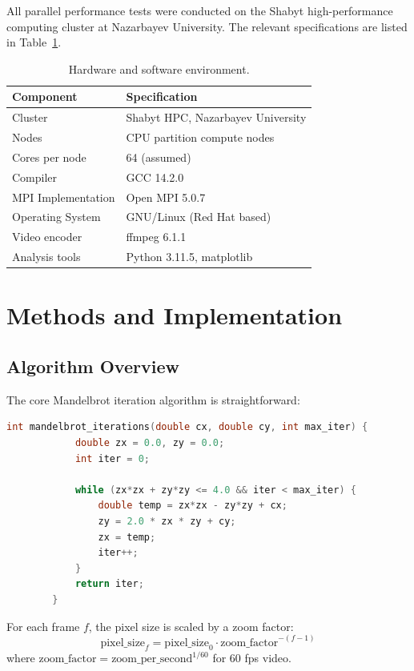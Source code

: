 \documentclass[11pt,a4paper]{article}
\begin{document}
	All parallel performance tests were conducted on the Shabyt high-performance computing cluster at Nazarbayev University. The relevant specifications are listed in Table~\ref{table:hardware}.
	
	\begin{table}[H]
		\centering
		\caption{Hardware and software environment.}
		\label{table:hardware}
		\begin{tabular}{ll}
			\toprule
			Component & Specification \\
			\midrule
			Cluster & Shabyt HPC, Nazarbayev University \\
			Nodes & CPU partition compute nodes \\
			Cores per node & 64 (assumed) \\
			Compiler & GCC 14.2.0 \\
			MPI Implementation & Open MPI 5.0.7 \\
			Operating System & GNU/Linux (Red Hat based) \\
			Video encoder & ffmpeg 6.1.1 \\
			Analysis tools & Python 3.11.5, matplotlib \\
			\bottomrule
		\end{tabular}
	\end{table}
	
	\section{Methods and Implementation}
	
	\subsection{Algorithm Overview}
	
	The core Mandelbrot iteration algorithm is straightforward:
	
	\begin{lstlisting}[language=C++, caption={Mandelbrot iteration kernel}]
		int mandelbrot_iterations(double cx, double cy, int max_iter) {
			double zx = 0.0, zy = 0.0;
			int iter = 0;
			
			while (zx*zx + zy*zy <= 4.0 && iter < max_iter) {
				double temp = zx*zx - zy*zy + cx;
				zy = 2.0 * zx * zy + cy;
				zx = temp;
				iter++;
			}
			return iter;
		}
	\end{lstlisting}
	
	For each frame $f$, the pixel size is scaled by a zoom factor:
	\begin{equation}
		\text{pixel\_size}_f = \text{pixel\_size}_0 \cdot \text{zoom\_factor}^{-(f-1)}
	\end{equation}
	where $\text{zoom\_factor} = \text{zoom\_per\_second}^{1/60}$ for 60 fps video.
	
\end{document}
